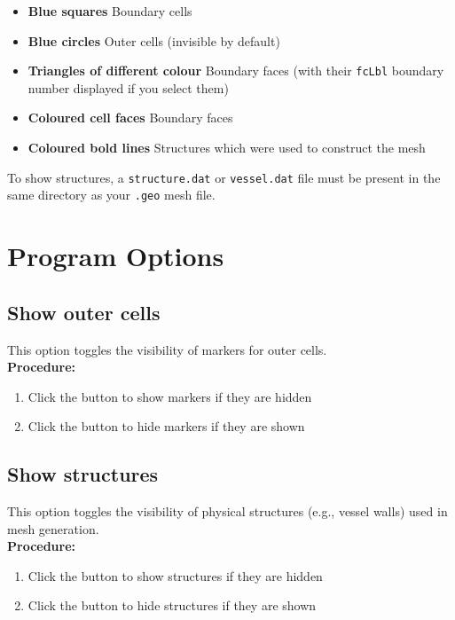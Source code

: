 \documentclass[a4paper,12pt]{article}
\begin{document}
  \begin{itemize}[itemsep=2pt,topsep=5pt]
    \item {\bf Blue squares} Boundary cells
    \item {\bf Blue circles} Outer cells (invisible by default)
    \item {\bf Triangles of different colour} Boundary faces (with their {\tt fcLbl} boundary number displayed if you select them)
    \item {\bf Coloured cell faces} Boundary faces
    \item {\bf Coloured bold lines} Structures which were used to construct the mesh
  \end{itemize}

  \begin{infobox}
    To show structures, a {\tt structure.dat} or {\tt vessel.dat} file must be present in the same directory as your {\tt .geo} mesh file.
  \end{infobox}

  \section{Program Options}

  \subsection{Show outer cells}

  This option toggles the visibility of markers for outer cells. \\

  \textbf{Procedure:}
  \begin{enumerate}[itemsep=2pt,topsep=5pt]
    \item Click the button to show markers if they are hidden
    \item Click the button to hide markers if they are shown
  \end{enumerate}

  \subsection{Show structures}

  This option toggles the visibility of physical structures (e.g., vessel walls) used in mesh generation. \\

  \textbf{Procedure:}
  \begin{enumerate}[itemsep=2pt,topsep=5pt]
    \item Click the button to show structures if they are hidden
    \item Click the button to hide structures if they are shown
  \end{enumerate}
\end{document}
